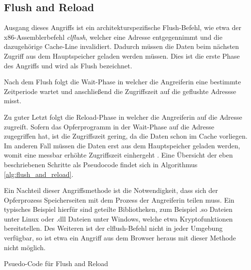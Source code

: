 \subsection{Flush and Reload}

Ausgang dieses Angriffs ist ein architekturspezifische Flush-Befehl, wie etwa der x86-Assemblerbefehl \textit{clflush}, welcher eine Adresse entgegennimmt und die dazugehörige Cache-Line invalidiert. 
Dadurch müssen die Daten beim nächsten Zugriff aus dem Hauptspeicher geladen werden müssen. Dies ist die erste Phase des Angriffs und wird als Flush bezeichnet. 

Nach dem Flush folgt die Wait-Phase in welcher die Angreiferin eine bestimmte Zeitperiode wartet und anschließend die Zugriffszeit auf die geflushte Adressse misst. 

Zu guter Letzt folgt die Reload-Phase in welcher die Angreiferin auf die Adresse zugreift. Sofern das Opferprogramm in der Wait-Phase auf die Adresse zugegriffen hat, ist die Zugriffszeit gering, da die Daten schon im Cache vorliegen.
Im anderen Fall müssen die Daten erst aus dem Hauptspeicher geladen werden, womit eine messbar erhöhte Zugriffszeit einhergeht \cite{FlushReload}. Eine Übersicht der eben beschriebenen Schritte als Pseudocode findet sich in Algorithmus \ref{alg:flush_and_reload}.

Ein Nachteil dieser Angriffsmethode ist die Notwendigkeit, dass sich der Opferprozess Speicherseiten mit dem Prozess der Angreiferin teilen muss. 
Ein typisches Beispiel hierfür sind geteilte Bibliotheken, zum Beispiel .so Dateien unter Linux oder .dll Dateien unter Windows, welche etwa Kryptofunktionen bereitstellen. Des Weiteren ist der clflush-Befehl nicht in jeder Umgebung verfügbar, so ist etwa ein Angriff aus dem Browser heraus mit dieser Methode nicht möglich. 


\begin{algorithm}[h]
\DontPrintSemicolon
\caption{Psuedo-Code für Flush and Reload}
\label{alg:flush_and_reload}


\end{algorithm}

